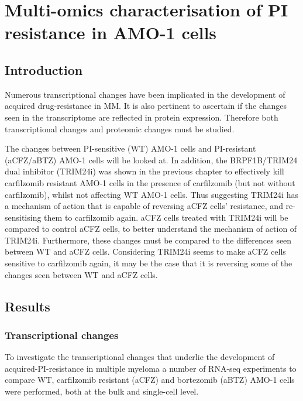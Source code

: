 \chapter{\label{ch:6-results_omics}Multi-omics characterisation of PI resistance in AMO-1 cells}


\section{Introduction}\label{sec:omics-intro}
Numerous transcriptional changes have been implicated in the development of acquired drug-resistance in MM.
It is also pertinent to ascertain if the changes seen in the transcriptome are reflected in protein expression.
Therefore both transcriptional changes and proteomic changes must be studied.

The changes between PI-sensitive (WT) AMO-1 cells and PI-resistant (aCFZ/aBTZ) AMO-1 cells will be looked at.
In addition, the BRPF1B/TRIM24 dual inhibitor (TRIM24i) was shown in the previous chapter to effectively kill carfilzomib resistant AMO-1 cells in the presence of carfilzomib (but not without carfilzomib), whilst not affecting WT AMO-1 cells.
Thus suggesting TRIM24i has a mechanism of action that is capable of reversing aCFZ cells' resistance, and re-sensitising them to carfilzomib again.
aCFZ cells treated with TRIM24i will be compared to control aCFZ cells, to better understand the mechanism of action of TRIM24i.
Furthermore, these changes must be compared to the differences seen between WT and aCFZ cells.
Considering TRIM24i seems to make aCFZ cells sensitive to carfilzomib again, it may be the case that it is reversing some of the changes seen between WT and aCFZ cells.

\section{Results}\label{sec:omics-results}

\subsection{Transcriptional changes}\label{sec:omics-transcriptomics}
To investigate the transcriptional changes that underlie the development of acquired-PI-resistance in multiple myeloma a number of RNA-seq experiments to compare WT, carfilzomib resistant (aCFZ) and bortezomib (aBTZ) AMO-1 cells were performed, both at the bulk and single-cell level.

